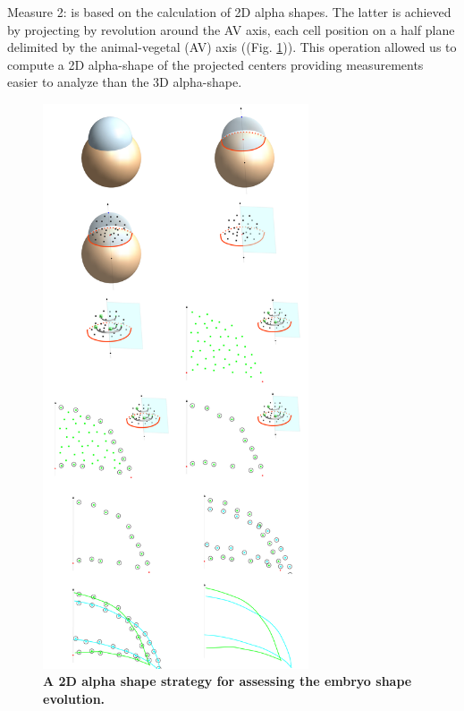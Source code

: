   Measure 2: is based on the calculation of 2D alpha shapes. The latter is achieved by projecting by revolution around the AV axis, each cell position on a half plane delimited by the animal-vegetal (AV) axis ((Fig. \ref{Case_2_Cleavage_schematics_lowres})). This operation allowed us to compute a 2D alpha-shape of the projected centers providing measurements easier to analyze than the 3D alpha-shape.  
\begin{figure}
\begin{center}
\includegraphics[width=0.7\textwidth]{../../images/Cases_Studies/Case_2_Cleavage/schematics_lowres.png}
\end{center}
\caption{\textbf{A 2D alpha shape strategy for assessing the embryo shape evolution.}}
\label{Case_2_Cleavage_schematics_lowres}
\end{figure}

